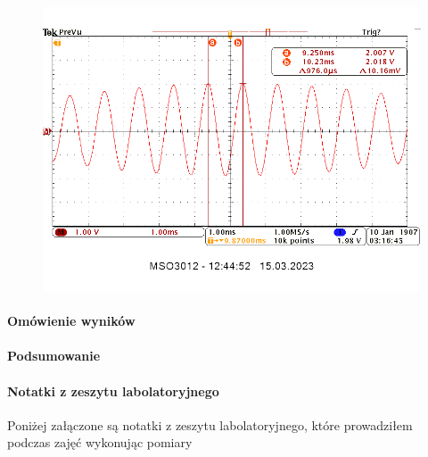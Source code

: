 \documentclass[14pt, table]{extarticle}
\begin{document}
\begin{figure}[H]
\includegraphics[scale=0.7]{A3}
\centering
\end{figure}




\paragraph{Omówienie wyników}

\paragraph{Podsumowanie}
\newpage
\paragraph{Notatki z zeszytu labolatoryjnego}
Poniżej załączone są notatki z zeszytu labolatoryjnego, które prowadziłem podczas zajęć wykonując pomiary
\end{document}

